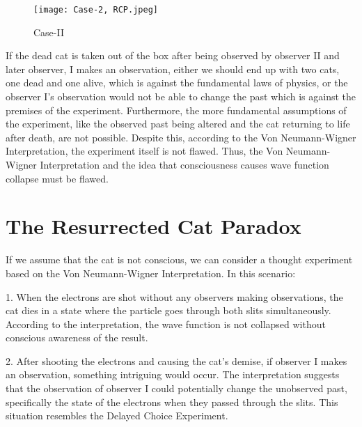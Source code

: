 \documentclass{article}
\begin{document}
\begin{figure}
\centering
     \texttt{[image: Case-2, RCP.jpeg]}
      \caption{Case-II}
       \label{fig:Wavefn}
\end{figure}






















If the dead cat is taken out of the box after being observed
by observer II and later observer, I makes an observation, either we should end up with two cats, one dead and one alive,
which is against the fundamental laws of physics, or the observer
I's observation would not be able to change the past which
is against the premises of the experiment. Furthermore, the
more fundamental assumptions of the experiment, like the
observed past being altered and the cat returning to life after death, are not possible. Despite this, according to the Von
Neumann-Wigner Interpretation, the experiment itself is
not flawed. Thus, the Von Neumann-Wigner Interpretation
and the idea that consciousness causes wave function collapse
must be flawed.


\section{\Large The Resurrected Cat Paradox}


If we assume that the cat is not conscious, we can consider a thought experiment based on the Von Neumann-Wigner Interpretation. In this scenario:

1. When the electrons are shot without any observers making observations, the cat dies in a state where the particle goes through both slits simultaneously. According to the interpretation, the wave function is not collapsed without conscious awareness of the result.

2. After shooting the electrons and causing the cat's demise, if observer I makes an observation, something intriguing would occur. The interpretation suggests that the observation of observer I could potentially change the unobserved past, specifically the state of the electrons when they passed through the slits. This situation resembles the Delayed Choice Experiment.
\end{document}
